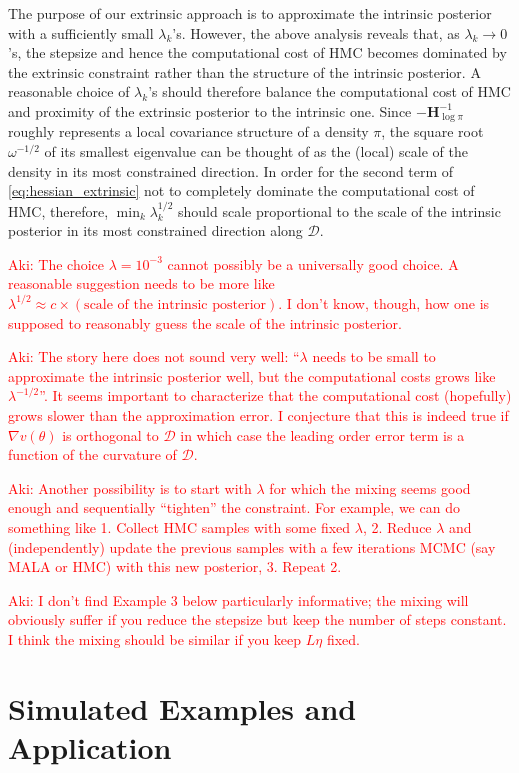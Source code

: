 \documentclass[10pt]{article}
\newcommand{\aki}[1]{\textcolor{red}{Aki: #1}}
\newcommand{\mc}[1]{\mathcal{#1}}
\DeclareMathOperator{\1}{\mathbbm{1}}
\newcommand{\dt}{\eta} %
\newcommand{\hess}{\mathbf{H}} %
\begin{document}
The purpose of our extrinsic approach is to approximate the intrinsic posterior with a sufficiently small $\lambda_k$'s. However, the above analysis reveals that, as $\lambda_k \to 0$'s, the stepsize and hence the computational cost of HMC becomes dominated by the extrinsic constraint rather than the structure of the intrinsic posterior. A reasonable choice of $\lambda_k$'s should therefore balance the computational cost of HMC and  proximity of the extrinsic posterior to the intrinsic one. Since $- \hess_{\log \pi}^{-1}$ roughly represents a local covariance structure of a density $\pi$, the square root $\omega^{-1 / 2}$ of its smallest eigenvalue can be thought of as the (local) scale of the density in its most constrained direction. In order for the second term of \eqref{eq:hessian_extrinsic} not to completely dominate the computational cost of HMC, therefore, $\min_k \lambda_k^{1/2}$ should scale proportional to the scale of the intrinsic posterior in its most constrained direction along $\mc D$.

\aki{The choice $\lambda = 10^{-3}$ cannot possibly be a universally good choice. A reasonable suggestion needs to be more like $\lambda^{1/2} \approx c \times (\text{scale of the intrinsic posterior})$. I don't know, though, how one is supposed to reasonably guess the scale of the intrinsic posterior. }

\aki{The story here does not sound very well: ``$\lambda$ needs to be small to approximate the intrinsic posterior well, but the computational costs grows like $\lambda^{-1/2}$''. It seems important to characterize that the computational cost (hopefully) grows slower than the approximation error. I conjecture that this is indeed true if $\nabla v(\theta)$ is orthogonal to $\mc D$ in which case the leading order error term is a function of the curvature of $\mc D$.}

\aki{Another possibility is to start with $\lambda$ for which the mixing seems good enough and sequentially ``tighten'' the constraint. For example, we can do something like 1. Collect HMC samples with some fixed $\lambda$, 2. Reduce $\lambda$ and (independently) update the previous samples with a few iterations MCMC (say MALA or HMC) with this new posterior, 3. Repeat 2.}

\aki{I don't find Example 3 below particularly informative; the mixing will obviously suffer if you reduce the stepsize but keep the number of steps constant. I think the mixing should be similar if you keep $L \dt$ fixed. } 

\section{Simulated Examples and Application}
\end{document}

